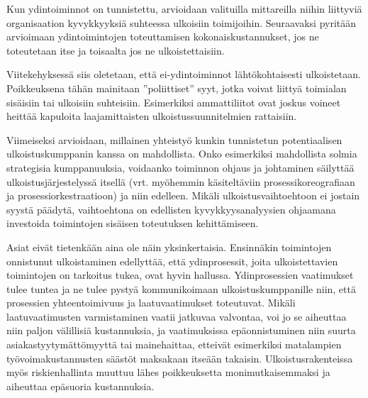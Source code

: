 \documentclass[
  finnish,
  letterpaper,
  DIV=11,
  numbers=noendperiod,
  oneside]{scrreprt}
\begin{document}
Kun ydintoiminnot on tunnistettu, arvioidaan valituilla mittareilla
niihin liittyviä organisaation kyvykkyyksiä suhteessa ulkoisiin
toimijoihin. Seuraavaksi pyritään arvioimaan ydintoimintojen
toteuttamisen kokonaiskustannukset, jos ne toteutetaan itse ja toisaalta
jos ne ulkoistettaisiin.

Viitekehyksessä siis oletetaan, että ei-ydintoiminnot lähtökohtaisesti
ulkoistetaan. Poikkeuksena tähän mainitaan ''poliittiset'' syyt, jotka
voivat liittyä toimialan sisäisiin tai ulkoisiin suhteisiin. Esimerkiksi
ammattiliitot ovat joskus voineet heittää kapuloita laajamittaisten
ulkoistussuunnitelmien rattaisiin.

Viimeiseksi arvioidaan, millainen yhteistyö kunkin tunnistetun
potentiaalisen ulkoistuskumppanin kanssa on mahdollista. Onko
esimerkiksi mahdollista solmia strategisia kumppanuuksia, voidaanko
toiminnon ohjaus ja johtaminen säilyttää ulkoistusjärjestelyssä itsellä
(vrt. myöhemmin käsiteltäviin prosessikoreografiaan ja
prosessiorkestraatioon) ja niin edelleen. Mikäli ulkoistusvaihtoehtoon
ei jostain syystä päädytä, vaihtoehtona on edellisten
kyvykkyysanalyysien ohjaamana investoida toimintojen sisäisen
toteutuksen kehittämiseen.

Asiat eivät tietenkään aina ole näin yksinkertaisia. Ensinnäkin
toimintojen onnistunut ulkoistaminen edellyttää, että ydinprosessit,
joita ulkoistettavien toimintojen on tarkoitus tukea, ovat hyvin
hallussa. Ydinprosessien vaatimukset tulee tuntea ja ne tulee pystyä
kommunikoimaan ulkoistuskumppanille niin, että prosessien
yhteentoimivuus ja laatuvaatimukset toteutuvat. Mikäli laatuvaatimusten
varmistaminen vaatii jatkuvaa valvontaa, voi jo se aiheuttaa niin paljon
välillisiä kustannuksia, ja vaatimuksissa epäonnistuminen niin suurta
asiakastyytymättömyyttä tai mainehaittaa, etteivät esimerkiksi
matalampien työvoimakustannusten säästöt maksakaan itseään takaisin.
Ulkoistusrakenteissa myös riskienhallinta muuttuu lähes poikkeuksetta
monimutkaisemmaksi ja aiheuttaa epäsuoria kustannuksia.
\end{document}
